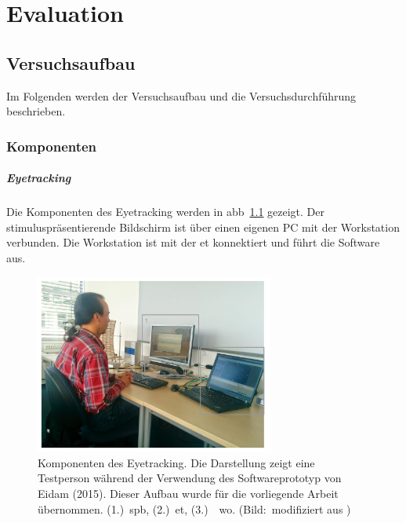 
\chapter{Evaluation}
\label{chapter:evaluation}

\section{Versuchsaufbau}
\label{section:versuchsaufbau}
Im Folgenden werden der Versuchsaufbau und die Versuchsdurchführung beschrieben.

\subsection{Komponenten}

\paragraph{Eyetracking}
Die Komponenten des Eyetracking werden in \acs{abb}~\ref{fig:komponenten} gezeigt. Der stimuluspräsentierende Bildschirm ist über einen eigenen PC mit der Workstation verbunden. Die Workstation ist mit der \acs{et} konnektiert und führt die \iV Software aus. 

\begin{figure}[ht]
\begin{center}
\includegraphics[width=0.7\textwidth]{bilder/evaluation/anordung.pdf}\hfill
\end{center}
\caption{Komponenten des Eyetracking. Die Darstellung zeigt eine Testperson während der Verwendung des Softwareprototyp von Eidam (2015). Dieser Aufbau wurde für die vorliegende Arbeit übernommen.  (1.)~\acs{spb}, (2.)~\acs{et}, (3.)~\iV ~\acs{wo}. (Bild:~modifiziert aus \cite[S.51]{Eidam2015})}
\label{fig:komponenten}
\end{figure}

